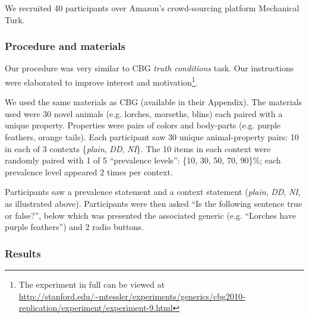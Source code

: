 \documentclass[10pt,letterpaper]{article}
\begin{document}
We recruited 40 participants over Amazon's crowd-sourcing platform Mechanical Turk.  

\subsubsection{Procedure and materials}

Our procedure was very similar to CBG \emph{truth conditions} task. Our instructions were elaborated to improve interest and motivation\footnote{The experiment in full can be viewed at \url{http://stanford.edu/~mtessler/experiments/generics/cbg2010-replication/experiment/experiment-9.html}}. 

We used the same materials as CBG (available in their Appendix). The materials used were 30 novel animals (e.g. lorches, morseths, blins) each paired with a unique property. Properties were pairs of colors and body-parts (e.g. purple feathers, orange tails). Each participant saw 30 unique animal-property pairs: 10 in each of 3 contexts \{\emph{plain}, \emph{DD}, \emph{NI}\}. The 10 items in each context were randomly paired with 1 of 5 ``prevalence levels'': \{10, 30, 50, 70, 90\}\%; each prevalence level appeared 2 times per context. 

Participants saw a prevalence statement and a context statement (\emph{plain}, \emph{DD}, \emph{NI}, as illustrated above). 
Participants were then asked ``Is the following sentence true or false?'', below which was presented the associated generic (e.g. ``Lorches have purple feathers'') and 2 radio buttons. 

\subsubsection{Results}
\end{document}
